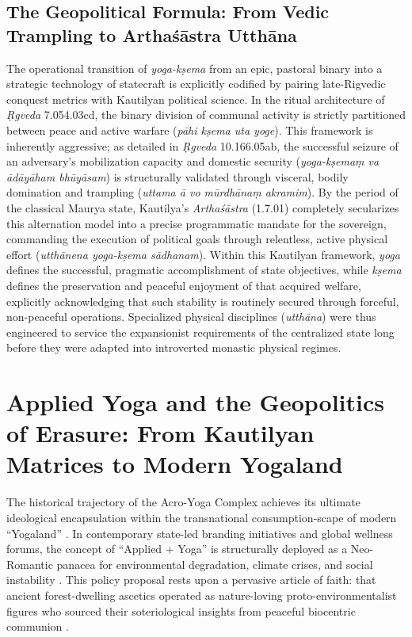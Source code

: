 \documentclass[11pt,letterpaper]{article}
\begin{document}
\subsection{The Geopolitical Formula: From Vedic Trampling to Arthaśāstra Utthāna}
The operational transition of \textit{yoga-kṣema} from an epic, pastoral binary into a strategic technology of statecraft is explicitly codified by pairing late-Rigvedic conquest metrics with Kautilyan political science. In the ritual architecture of \textit{Ṛgveda} 7.054.03cd, the binary division of communal activity is strictly partitioned between peace and active warfare (\textit{pāhi kṣema uta yoge}). This framework is inherently aggressive; as detailed in \textit{Ṛgveda} 10.166.05ab, the successful seizure of an adversary’s mobilization capacity and domestic security (\textit{yoga-kṣemaṃ va ādāyāham bhūyāsam}) is structurally validated through visceral, bodily domination and trampling (\textit{uttama ā vo mūrdhānaṃ akramim}). By the period of the classical Maurya state, Kautilya’s \textit{Arthaśāstra} (1.7.01) completely secularizes this alternation model into a precise programmatic mandate for the sovereign, commanding the execution of political goals through relentless, active physical effort (\textit{utthānena yoga-kṣema sādhanam}). Within this Kautilyan framework, \textit{yoga} defines the successful, pragmatic accomplishment of state objectives, while \textit{kṣema} defines the preservation and peaceful enjoyment of that acquired welfare, explicitly acknowledging that such stability is routinely secured through forceful, non-peaceful operations. Specialized physical disciplines (\textit{utthāna}) were thus engineered to service the expansionist requirements of the centralized state long before they were adapted into introverted monastic physical regimes.

\section{Applied Yoga and the Geopolitics of Erasure: From Kautilyan Matrices to Modern Yogaland}

The historical trajectory of the Acro-Yoga Complex achieves its ultimate ideological encapsulation within the transnational consumption-scape of modern ``Yogaland'' \cite{McCartney2021, McCartney2026}. In contemporary state-led branding initiatives and global wellness forums, the concept of ``Applied + Yoga'' is structurally deployed as a Neo-Romantic panacea for environmental degradation, climate crises, and social instability \cite{McCartney2021}. This policy proposal rests upon a pervasive article of faith: that ancient forest-dwelling ascetics operated as nature-loving proto-environmentalist figures who sourced their soteriological insights from peaceful biocentric communion \cite{McCartney2021}. 
\end{document}
